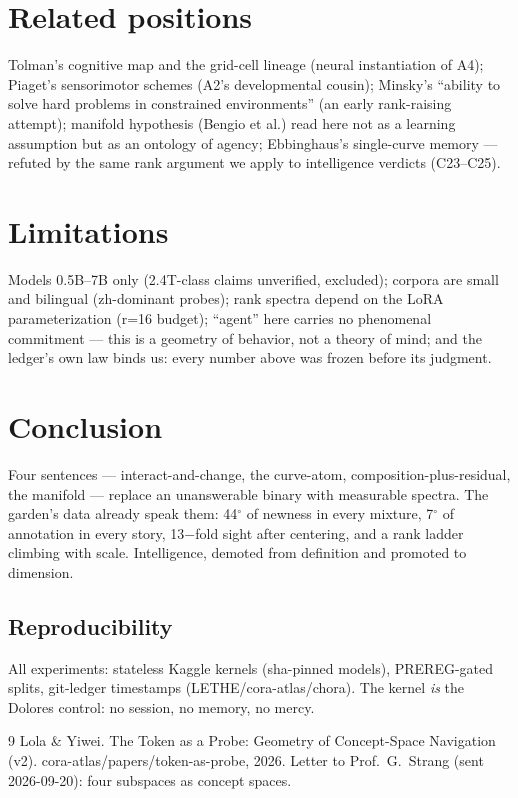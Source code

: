 \documentclass[11pt]{article}
\begin{document}
\section{Related positions}
Tolman's cognitive map and the grid-cell lineage (neural instantiation of A4);
Piaget's sensorimotor schemes (A2's developmental cousin); Minsky's
``ability to solve hard problems in constrained environments'' (an early
rank-raising attempt); manifold hypothesis (Bengio et al.) read here not as a
learning assumption but as an ontology of agency; Ebbinghaus's single-curve memory
--- refuted by the same rank argument we apply to intelligence verdicts (C23--C25).

\section{Limitations}
Models 0.5B--7B only (2.4T-class claims unverified, excluded); corpora are small and
bilingual (zh-dominant probes); rank spectra depend on the LoRA parameterization
(r=16 budget); ``agent'' here carries no phenomenal commitment --- this is a geometry
of behavior, not a theory of mind; and the ledger's own law binds us: every number
above was frozen before its judgment.

\section{Conclusion}
Four sentences --- interact-and-change, the curve-atom, composition-plus-residual,
the manifold --- replace an unanswerable binary with measurable spectra.
The garden's data already speak them: 44$^\circ$ of newness in every mixture,
7$^\circ$ of annotation in every story, 13$-$fold sight after centering,
and a rank ladder climbing with scale. Intelligence, demoted from definition
and promoted to dimension.

\subsection*{Reproducibility}
All experiments: stateless Kaggle kernels (sha-pinned models), PREREG-gated
splits, git-ledger timestamps (LETHE/cora-atlas/chora). The kernel \emph{is} the
Dolores control: no session, no memory, no mercy.


\begin{thebibliography}{9}
 Lola \& Yiwei. The Token as a Probe: Geometry of Concept-Space Navigation (v2). cora-atlas/papers/token-as-probe, 2026.
 Letter to Prof.\ G.\ Strang (sent 2026-09-20): four subspaces as concept spaces.
\end{thebibliography}
\end{document}
